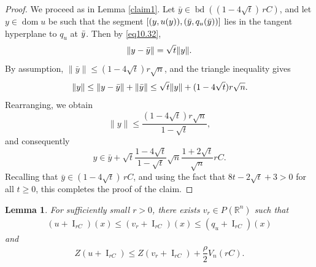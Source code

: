 \documentclass[11pt]{article}
\newtheorem{lema}[teo]{Lemma}
\theoremstyle{definition} %
\newcommand{\RR}{(\mathbb{R}^n)}
\DeclareMathOperator{\I}{I}
\DeclareMathOperator{\LQ}{_{l.q}}
\DeclareMathOperator{\dom}{dom}
\DeclareMathOperator{\bd}{bd}
\begin{document}
\begin{proof}
We proceed as in   Lemma \ref{claim1}. Let  $\bar{y}\in \bd((1-4\sqrt{t})\,rC)$,  and let $y\in \dom u$ be such that the segment $[(y, u(y)),(\Bar{y}, q_u(\Bar{y}))]$ lies in the tangent hyperplane to $q_u$ at $\Bar{y}$. Then by   \eqref{eq10.32},
$$\|y-\Bar{y}\|= \sqrt{t}\|y\|.$$
By assumption, $\|\bar{y}\|\leq (1-4\sqrt{t})r\sqrt{n}$, and the triangle inequality gives
$$\|y\|\leq \|y- \Bar{y}\|+\|\Bar{y}\|\leq \sqrt{t}\|y\|+(1-4\sqrt{t})r\sqrt{n}.$$
Rearranging, we obtain
$$\|y\|\leq \dfrac{(1-4\sqrt{t})r\sqrt{n}}{1-\sqrt{t}},$$
and consequently
$$y\in \bar{y}+\sqrt{t}\dfrac{1-4\sqrt{t}}{1-\sqrt{t}}\sqrt{n}\dfrac{1+2\sqrt{t}}{\sqrt{n}}rC.$$
Recalling that $\bar{y}\in (1-4\sqrt{t})\,rC$, and using the fact that $8t-2\sqrt{t}+3>0$ for all $t\geq 0$, this completes the proof of the claim.
\end{proof}



\begin{lema}\label{lema*}
For sufficiently small $r>0$, there exists  $v_r\in P_{\LQ}\RR$ such that
\begin{align*}
 (u + \I_{rC})(x)\leq (v_r+\I_{rC})(x) \leq  (q_u+\I_{rC})(x) 
\end{align*}
and 
\begin{align}\label{eq10.39}
    Z(u + \I_{rC})\leq Z(v_r+\I_{rC})+\dfrac{\rho}{2}V_n(rC).
\end{align}
\end{lema}
\end{document}
